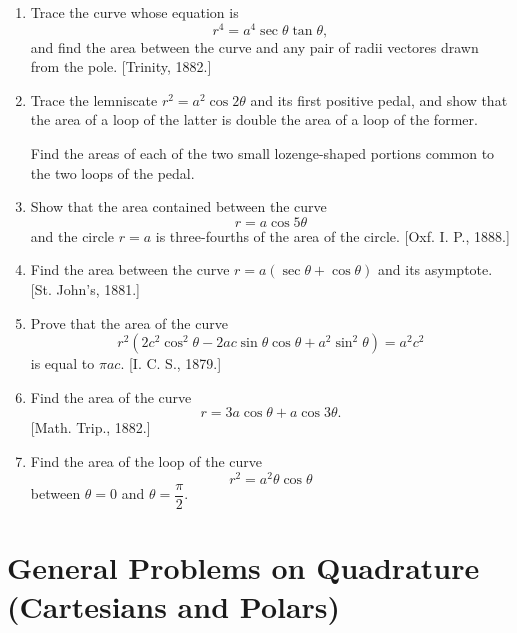 \documentclass[11pt, a4paper]{article}
\newcommand{\source}[1]{\hfill\textnormal{[#1]}}
\begin{document}
\begin{enumerate}[leftmargin=2em]
\item Trace the curve whose equation is
\[
r^4=a^4\sec\theta\tan\theta,
\]
and find the area between the curve and any pair of radii vectores drawn from the pole. \source{Trinity, 1882.}

\item Trace the lemniscate $r^2=a^2\cos2\theta$ and its first positive pedal, and show that the area of a loop of the latter is double the area of a loop of the former.

Find the areas of each of the two small lozenge-shaped portions common to the two loops of the pedal.

\item Show that the area contained between the curve
\[
r=a\cos5\theta
\]
and the circle $r=a$ is three-fourths of the area of the circle. \source{Oxf. I. P., 1888.}

\item Find the area between the curve $r=a(\sec\theta+\cos\theta)$ and its asymptote. \source{St. John's, 1881.}

\item Prove that the area of the curve
\[
r^2(2c^2\cos^2\theta-2ac\sin\theta\cos\theta+a^2\sin^2\theta)=a^2c^2
\]
is equal to $\pi ac$. \source{I. C. S., 1879.}

\item Find the area of the curve
\[
r=3a\cos\theta+a\cos3\theta.
\]
\source{Math. Trip., 1882.}

\item Find the area of the loop of the curve
\[
r^2=a^2\theta\cos\theta
\]
between $\theta=0$ and $\theta=\dfrac{\pi}{2}$.

\end{enumerate}

\section*{General Problems on Quadrature (Cartesians and Polars)}
\end{document}
